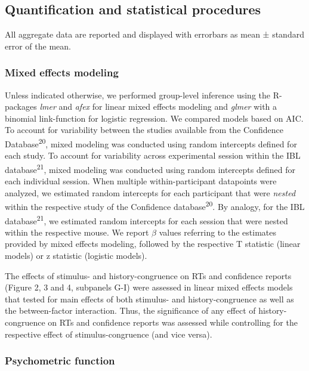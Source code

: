 \documentclass[
]{article}
\begin{document}
\hypertarget{quantification-and-statistical-procedures}{%
\subsection{Quantification and statistical
procedures}\label{quantification-and-statistical-procedures}}

All aggregate data are reported and displayed with errorbars as mean ±
standard error of the mean.

\hypertarget{mixed-effects-modeling}{%
\subsubsection{Mixed effects modeling}\label{mixed-effects-modeling}}

Unless indicated otherwise, we performed group-level inference using the
R-packages \emph{lmer} and \emph{afex} for linear mixed effects modeling
and \emph{glmer} with a binomial link-function for logistic regression.
We compared models based on AIC. To account for variability between the
studies available from the Confidence Database\textsuperscript{20},
mixed modeling was conducted using random intercepts defined for each
study. To account for variability across experimental session within the
IBL database\textsuperscript{21}, mixed modeling was conducted using
random intercepts defined for each individual session. When multiple
within-participant datapoints were analyzed, we estimated random
intercepts for each participant that were \emph{nested} within the
respective study of the Confidence database\textsuperscript{20}. By
analogy, for the IBL database\textsuperscript{21}, we estimated random
intercepts for each session that were nested within the respective
mouse. We report \(\beta\) values referring to the estimates provided by
mixed effects modeling, followed by the respective T statistic (linear
models) or z statistic (logistic models).

The effects of stimulus- and history-congruence on RTs and confidence
reports (Figure 2, 3 and 4, subpanels G-I) were assessed in linear mixed
effects models that tested for main effects of both stimulus- and
history-congruence as well as the between-factor interaction. Thus, the
significance of any effect of history-congruence on RTs and confidence
reports was assessed while controlling for the respective effect of
stimulus-congruence (and vice versa).

\hypertarget{psychometric-function}{%
\subsubsection{Psychometric function}\label{psychometric-function}}
\end{document}

